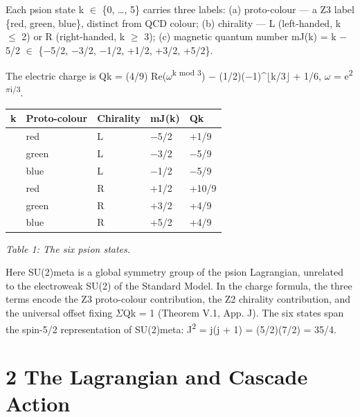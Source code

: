\documentclass[11pt,letterpaper]{article}
\begin{document}
\noindent Each psion state k $\in$ \{0, \ldots{}, 5\} carries three labels: (a) proto-colour --- a Z3 label \{red, green, blue\}, distinct from QCD colour; (b) chirality --- L (left-handed, k $\le$ 2) or R (right-handed, k $\ge$ 3); (c) magnetic quantum number mJ(k) = k $-$ 5/2 $\in$ \{$-$5/2, $-$3/2, $-$1/2, +1/2, +3/2, +5/2\}.

\noindent The electric charge is Qk = (4/9) Re($\omega$\textsuperscript{k mod 3}) $-$ (1/2)($-$1)\textasciicircum{}$\lfloor$k/3$\rfloor$ + 1/6,  $\omega$ = e\textsuperscript{2$\pi$i/3}.

\begin{footnotesize}\begin{longtable}{|>{\raggedright\arraybackslash}p{}|>{\raggedright\arraybackslash}p{}|>{\raggedright\arraybackslash}p{}|>{\raggedright\arraybackslash}p{}|>{\raggedright\arraybackslash}p{}|}
\hline
\textbf{k} & \textbf{Proto-colour} & \textbf{Chirality} & \textbf{mJ(k)} & \textbf{Qk} \\ \hline
0 & red & L & $-$5/2 & +1/9 \\ \hline
1 & green & L & $-$3/2 & $-$5/9 \\ \hline
2 & blue & L & $-$1/2 & $-$5/9 \\ \hline
3 & red & R & +1/2 & +10/9 \\ \hline
4 & green & R & +3/2 & +4/9 \\ \hline
5 & blue & R & +5/2 & +4/9 \\ \hline
\end{longtable}\end{footnotesize}

\begingroup\centering\footnotesize\itshape Table 1: The six psion states.\par\endgroup

\noindent Here SU(2)meta is a global symmetry group of the psion Lagrangian, unrelated to the electroweak SU(2) of the Standard Model. In the charge formula, the three terms encode the Z3 proto-colour contribution, the Z2 chirality contribution, and the universal offset fixing $\Sigma$Qk = 1 (Theorem V.1, App. J). The six states span the spin-5/2 representation of SU(2)meta: J\textsuperscript{2} = j(j + 1) = (5/2)(7/2) = 35/4.

\section*{2  The Lagrangian and Cascade Action}
\end{document}
